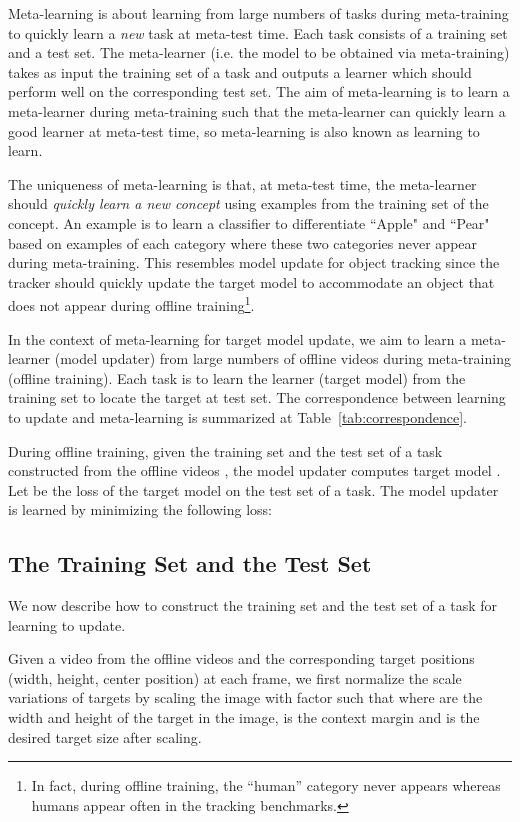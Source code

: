 \documentclass[journal]{IEEEtran}
\begin{document}
Meta-learning is about learning from large numbers of tasks during meta-training to quickly learn a \emph{new} task at meta-test time.
Each task consists of a training set and a test set. The meta-learner (i.e. the model to be obtained via meta-training) takes as input the training set of a task and outputs a learner which should perform well on the corresponding test set. The aim of meta-learning is to learn a meta-learner during meta-training such that the meta-learner can quickly learn a good learner at meta-test time, so meta-learning is also known as learning to learn.

The uniqueness of meta-learning is that, at meta-test time, the meta-learner should \emph{quickly learn a new concept} using examples from the training set of the concept. An example is to learn a classifier to differentiate ``Apple" and ``Pear" based on examples of each category where these two categories never appear during meta-training. This resembles model update for object tracking since the tracker should quickly update the target model to accommodate an object that does not appear during offline training\footnote{In fact, during offline training, the ``human'' category never appears whereas humans appear often in the tracking benchmarks.}.

In the context of meta-learning for target model update, we aim to learn a meta-learner (model updater) from large numbers of offline videos during meta-training (offline training). Each task is to learn the learner (target model) from the training set to locate the target at test set. The correspondence between learning to update and meta-learning is summarized at Table~\ref{tab:correspondence}.

During offline training, given the training set  and the test set  of a task constructed from the offline videos , the model updater computes target model . Let  be the loss of the target model on the test set  of a task. The model updater  is learned by minimizing the following loss: 


\subsection{The Training Set and the Test Set}
We now describe how to construct the training set and the test set of a task for learning to update.

Given a video from the offline videos and the corresponding target positions (width, height, center position) at each frame, we first normalize the scale variations of targets by scaling the image with factor  such that  where  are the width and height of the target in the image,  is the context margin and  is the desired target size after scaling.
\end{document}
